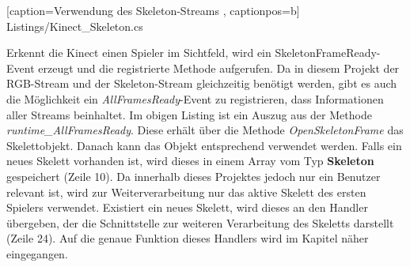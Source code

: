 
    [caption={Verwendung des Skeleton-Streams}
       \label{lst:kinect_skeleton_stream},
       captionpos=b]
{Listings/Kinect_Skeleton.cs}

\noindent
Erkennt die Kinect einen Spieler im Sichtfeld, wird ein SkeletonFrameReady-Event erzeugt und die registrierte Methode aufgerufen. Da in diesem Projekt der RGB-Stream und der Skeleton-Stream gleichzeitig benötigt werden, gibt es auch die Möglichkeit ein \textit{AllFramesReady}-Event zu registrieren, dass Informationen aller Streams beinhaltet. Im obigen Listing ist ein Auszug aus der Methode \textit{runtime\_AllFramesReady}. Diese erhält über die Methode \textit{OpenSkeletonFrame} das Skelettobjekt. Danach kann das Objekt entsprechend verwendet werden. Falls ein neues Skelett vorhanden ist, wird dieses in einem Array vom Typ \textbf{Skeleton} gespeichert (Zeile 10). Da innerhalb dieses Projektes jedoch nur ein Benutzer relevant ist, wird zur Weiterverarbeitung nur das aktive Skelett des ersten Spielers verwendet. Existiert ein neues Skelett, wird dieses an den Handler übergeben, der die Schnittstelle zur weiteren Verarbeitung des Skeletts darstellt (Zeile 24). Auf die genaue Funktion dieses Handlers wird im Kapitel  näher eingegangen.

%
%


